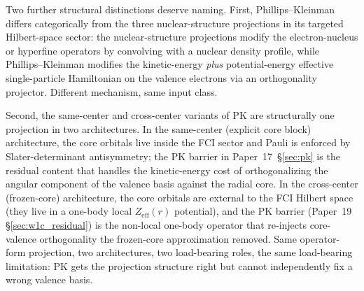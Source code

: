 Two further structural distinctions deserve naming.  First,
Phillips--Kleinman differs categorically from the three
nuclear-structure projections in its targeted Hilbert-space sector:
the nuclear-structure projections modify the
electron-nucleus or hyperfine operators by convolving with a nuclear
density profile, while Phillips--Kleinman modifies the kinetic-energy
\emph{plus} potential-energy effective single-particle Hamiltonian
on the valence electrons via an orthogonality projector.  Different
mechanism, same input class.

Second, the same-center and cross-center variants of PK are
structurally one projection in two architectures.  In the same-center
(explicit core block) architecture, the core orbitals live inside the
FCI sector and Pauli is enforced by Slater-determinant antisymmetry;
the PK barrier in Paper~17~\S\ref{sec:pk} is the residual content
that handles the kinetic-energy cost of orthogonalizing the angular
component of the valence basis against the radial core.  In the
cross-center (frozen-core) architecture, the core orbitals are
external to the FCI Hilbert space (they live in a one-body local
$Z_\text{eff}(r)$ potential), and the PK barrier (Paper~19
\S\ref{sec:w1c_residual}) is the non-local one-body operator that
re-injects core-valence orthogonality the frozen-core approximation
removed.  Same operator-form projection, two architectures, two
load-bearing roles, the same load-bearing limitation: PK gets the
projection structure right but cannot independently fix a wrong
valence basis.
